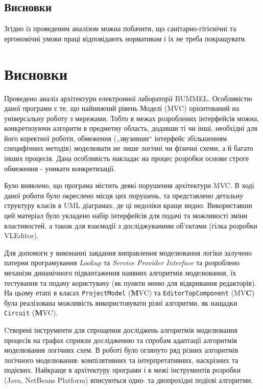 \documentclass[12pt,a4paper]{article}
\begin{document}
\subsection{Висновки}
Згідно із проведеним аналізом можна побачити, що санітарно-гігієнічні та ергономічні умови праці відповідають нормативам і їх не треба покращувати. 

\clearpage
 
\section{Висновки}

Проведено аналіз архітектури електронної лабораторії BUMMEL. Особливістю даної програми є те, що найнижчий рівень Моделі (MVC) орієнтований на універсальну роботу з мережами. Тобто в межах розроблених інтерфейсів можна, конкретизуючи алгоритм в предметну область, додавши ті чи інші, необхідні для його коректної роботи, обмеження („звузивши“ інтерфейс збільшенням специфічних методів) моделювати не лише логічні чи фізичні схеми, а й багато інших процесів. Дана особливість накладає на процес розробки основи строге обмеження - уникати конкретизації.

Було виявлено, що програма містить деякі порушення архітектури MVC. В ході даної роботи було окреслено місця цих порушень, та представлено детальну структуру класів в UML діаграмах, де ці недоліки краще видно. Використавши цей матеріал було укладено набір інтерфейсів для подачі та можливості зміни властивостей, а також для взаємодії з досліджуваними об’єктами (гілка розробки VLEditor).

Для допомоги у виконанні завдання виправлення моделювання логіки залучено патерни програмування \emph{Lookup} та \emph{Service Provider Interface} та розроблено механізм динамічного підвантаження наявних алгоритмів моделювання, їх тестування та подачу користувачу (як пункти меню для відкривання редакторів). На цьому етапі в класах \lstinline$ProjectModel$ (\textbf{M}VC) та \lstinline$EditorTopComponent$ (MV\textbf{C}) була реалізована можливість використовувати різні алгоритми, як нащадки \lstinline$Circuit$ (\textbf{M}VC).

Cтворені інструменти для спрощення досліджень алгоритмів моделювання процесів на графах сприяли дослідженню та спробам адаптації алгоритмів моделювання логічних схем. В роботі було оглянуто ряд різних алгоритмів логічного моделювання: компілятивних та інтерпретативних, наскрізних та подієвих. Найкраще в архітектуру програми і в межі інструментів розробки (Java, NetBeans Platform) вписуються одно- та двопрохідні подієві алгоритми.
\end{document}
